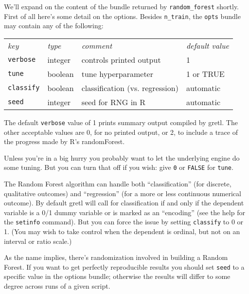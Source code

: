 \documentclass{article}
\begin{document}
We'll expand on the content of the bundle returned by
\texttt{random\_forest} shortly. First of all here's some detail on
the options. Besides \texttt{n\_train}, the \texttt{opts} bundle may
contain any of the following:

\begin{center}
\begin{tabular}{llll}
  \textit{key} & \textit{type} & \textit{comment} & \textit{default value} \\[4pt]
  \texttt{verbose} & integer & controls printed output & 1 \\
  \texttt{tune} & boolean & tune hyperparameter & 1 or TRUE \\
  \texttt{classify} & boolean & classification (vs. regression) & automatic\\
  \texttt{seed} & integer & seed for RNG in \textsf{R} & automatic
\end{tabular}
\end{center}

The default \texttt{verbose} value of 1 prints summary output compiled
by gretl. The other acceptable values are 0, for no printed output, or
2, to include a trace of the progress made by \textsf{R}'s
\textsf{randomForest}.

Unless you're in a big hurry you probably want to let the underlying
engine do some tuning. But you can turn that off if you wish: give
\texttt{0} or \texttt{FALSE} for \texttt{tune}.

The Random Forest algorithm can handle both ``classification'' (for
discrete, qualitative outcomes) and ``regression'' (for a more or less
continuous numerical outcome). By default gretl will call for
classification if and only if the dependent variable is a 0/1 dummy
variable or is marked as an ``encoding'' (see the help for the
\texttt{setinfo} command).  But you can force the issue by setting
\texttt{classify} to 0 or 1. (You may wish to take control when the
dependent is ordinal, but not on an interval or ratio scale.)

As the name implies, there's randomization involved in building a
Random Forest. If you want to get perfectly reproducible results you
should set \texttt{seed} to a specific value in the options bundle;
otherwise the results will differ to some degree across runs of a
given script.
\end{document}
